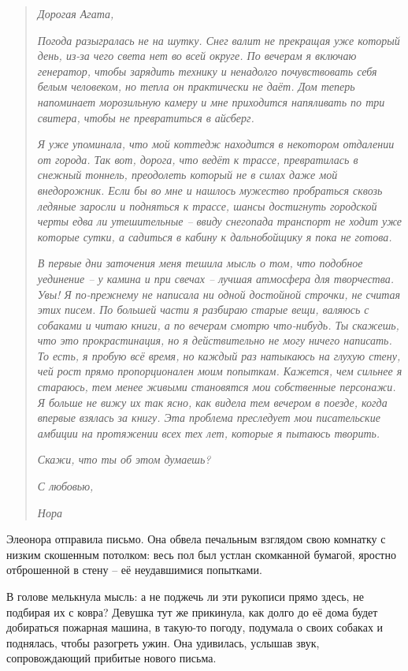 \documentclass[
  a5paperpaper,
  DIV=11,
  numbers=noendperiod]{scrreprt}
\begin{document}
\begin{quote}
\emph{Дорогая Агата,}

\emph{Погода разыгралась не на шутку. Снег валит не прекращая уже
который день, из-за чего света нет во всей округе. По вечерам я включаю
генератор, чтобы зарядить технику и ненадолго почувствовать себя белым
человеком, но тепла он практически не даёт. Дом теперь напоминает
морозильную камеру и мне приходится напяливать по три свитера, чтобы не
превратиться в айсберг.}

\emph{Я уже упоминала, что мой коттедж находится в некотором отдалении
от города. Так вот, дорога, что ведёт к трассе, превратилась в снежный
тоннель, преодолеть который не в силах даже мой внедорожник. Если бы во
мне и нашлось мужество пробраться сквозь ледяные заросли и подняться к
трассе, шансы достигнуть городской черты едва ли утешительные -- ввиду
снегопада транспорт не ходит уже которые сутки, а садиться в кабину к
дальнобойщику я пока не готова.}

\emph{В первые дни заточения меня тешила мысль о том, что подобное
уединение -- у камина и при свечах -- лучшая атмосфера для творчества.
Увы! Я по-прежнему не написала ни одной достойной строчки, не считая
этих писем. По большей части я разбираю старые вещи, валяюсь с собаками
и читаю книги, а по вечерам смотрю что-нибудь. Ты скажешь, что это
прокрастинация, но я действительно не могу ничего написать. То есть, я
пробую всё время, но каждый раз натыкаюсь на глухую стену, чей рост
прямо пропорционален моим попыткам. Кажется, чем сильнее я стараюсь, тем
менее живыми становятся мои собственные персонажи. Я больше не вижу их
так ясно, как видела тем вечером в поезде, когда впервые взялась за
книгу. Эта проблема преследует мои писательские амбиции на протяжении
всех тех лет, которые я пытаюсь творить.}

\emph{Скажи, что ты об этом думаешь?}

\emph{С любовью,}

\emph{Нора}
\end{quote}

Элеонора отправила письмо. Она обвела печальным взглядом свою комнатку с
низким скошенным потолком: весь пол был устлан скомканной бумагой,
яростно отброшенной в стену -- её неудавшимися попытками.

В голове мелькнула мысль: а не поджечь ли эти рукописи прямо здесь, не
подбирая их с ковра? Девушка тут же прикинула, как долго до её дома
будет добираться пожарная машина, в такую-то погоду, подумала о своих
собаках и поднялась, чтобы разогреть ужин. Она удивилась, услышав звук,
сопровождающий прибитые нового письма.
\end{document}

